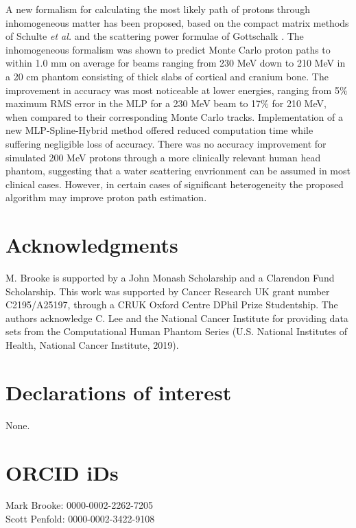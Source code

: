 \documentclass[preprint,times]{elsarticle}
\begin{document}
A new formalism for calculating the most likely path of protons through inhomogeneous matter has been proposed, based on the compact matrix methods of Schulte \emph{et al.} \citep{penfoldMLP} and the scattering power formulae of Gottschalk \citep{gottschalkRadioProtons}. The inhomogeneous formalism was shown to predict Monte Carlo proton paths to within 1.0 mm on average for beams ranging from 230 MeV down to 210 MeV in a 20 cm phantom consisting of thick slabs of cortical and cranium bone. The improvement in accuracy was most noticeable at lower energies, ranging from 5\% maximum RMS error in the MLP for a 230 MeV beam to 17\% for 210 MeV, when compared to their corresponding Monte Carlo tracks. Implementation of a new MLP-Spline-Hybrid method offered reduced computation time while suffering negligible loss of accuracy. There was no accuracy improvement for simulated 200 MeV protons through a more clinically relevant human head phantom, suggesting that a water scattering envrionment can be assumed in most clinical cases. However, in certain cases of significant heterogeneity the proposed algorithm may improve proton path estimation.

\section{Acknowledgments}

M. Brooke is supported by a John Monash Scholarship and a Clarendon Fund Scholarship. This work was supported by Cancer Research UK grant number C2195/A25197, through a CRUK Oxford Centre DPhil Prize Studentship. The authors acknowledge C. Lee and the National Cancer Institute for providing data sets from the Computational Human Phantom Series (U.S. National Institutes of Health, National Cancer Institute, 2019).

\section{Declarations of interest}

None.

\section{ORCID iDs}

\noindent Mark Brooke: 0000-0002-2262-7205\\
Scott Penfold: 0000-0002-3422-9108
\end{document}
